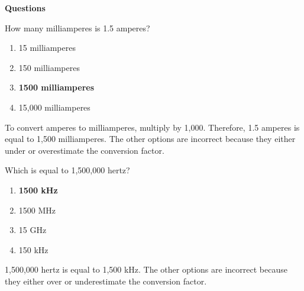 

\textbf{Questions}

\begin{tcolorbox}[colback=gray!10!white,colframe=black!75!black,title={T5B01}]
    How many milliamperes is 1.5 amperes?
    \begin{enumerate}[label=\Alph*),noitemsep]
        \item 15 milliamperes
        \item 150 milliamperes
        \item \textbf{1500 milliamperes}
        \item 15,000 milliamperes
    \end{enumerate}
\end{tcolorbox}
To convert amperes to milliamperes, multiply by 1,000. Therefore, 1.5 amperes is equal to 1,500 milliamperes. The other options are incorrect because they either under or overestimate the conversion factor.

\begin{tcolorbox}[colback=gray!10!white,colframe=black!75!black,title={T5B02}]
    Which is equal to 1,500,000 hertz?
    \begin{enumerate}[label=\Alph*),noitemsep]
        \item \textbf{1500 kHz}
        \item 1500 MHz
        \item 15 GHz
        \item 150 kHz
    \end{enumerate}
\end{tcolorbox}
1,500,000 hertz is equal to 1,500 kHz. The other options are incorrect because they either over or underestimate the conversion factor.

